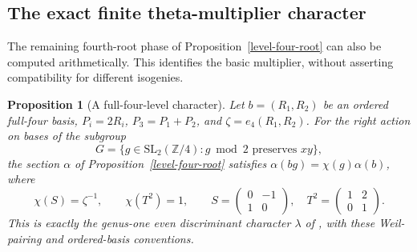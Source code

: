 \documentclass[11pt]{article}
\newtheorem{proposition}[theorem]{Proposition}
\theoremstyle{remark}\newtheorem{remark}[theorem]{Remark}
\newcommand{\Z}{\mathbb Z}\newcommand{\Q}{\mathbb Q}
\begin{document}
\subsection{The exact finite theta-multiplier character}
The remaining fourth-root phase of Proposition~\ref{level-four-root}
can also be computed arithmetically. This identifies the basic
multiplier, without asserting compatibility for different isogenies.

\begin{proposition}[A full-four-level character]\label{four-character}
Let $b=(R_1,R_2)$ be an ordered full-four basis, $P_i=2R_i$,
$P_3=P_1+P_2$, and $\zeta=e_4(R_1,R_2)$. For the right action on bases
of the subgroup
\[
 G=\{g\in\mathrm{SL}_2(\Z/4):g\bmod2\text{ preserves }xy\},
\]
the section $\alpha$ of Proposition~\ref{level-four-root} satisfies
$\alpha(bg)=\chi(g)\alpha(b)$, where
\[
 \chi(S)=\zeta^{-1},\qquad\chi(T^2)=1,\qquad
 S=\begin{pmatrix}0&-1\\1&0\end{pmatrix},\quad
 T^2=\begin{pmatrix}1&2\\0&1\end{pmatrix}.
\]
This is exactly the genus-one even discriminant character
$\lambda$ of \cite[Section 2.2]{candelori-key}, with these Weil-pairing
and ordered-basis conventions.
\end{proposition}
\end{document}
